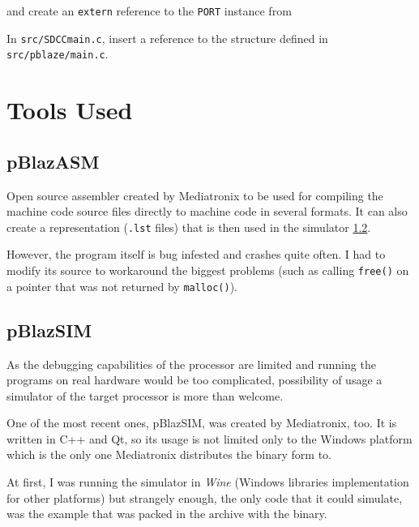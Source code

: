     and create an \texttt{extern} reference to the \texttt{PORT} instance from %


    In \texttt{src/SDCCmain.c}, insert a reference to the structure defined in \texttt{src/pblaze/main.c}.

    

    \section{Tools Used}

        \subsection{pBlazASM}

        Open source assembler created by Mediatronix to be used for compiling the machine code source files directly to machine code in several formats. It can also create a representation (\texttt{.lst} files) that is then used in the simulator \ref{pblazsim}.

        However, the program itself is bug infested and crashes quite often. I had to modify its source to workaround the biggest problems (such as calling \texttt{free()} on a pointer that was not returned by \texttt{malloc()}).

        \subsection{pBlazSIM}\label{pblazsim}

        As the debugging capabilities of the processor are limited and running the programs on real hardware would be too complicated, possibility of usage a simulator of the target processor is more than welcome.

        One of the most recent ones, pBlazSIM, was created by Mediatronix, too. It is written in C++ and Qt, so its usage is not limited only to the Windows platform which is the only one Mediatronix distributes the binary form to.

        At first, I was running the simulator in \emph{Wine} (Windows libraries implementation for other platforms) but strangely enough, the only code that it could simulate, was the example that was packed in the archive with the binary.

